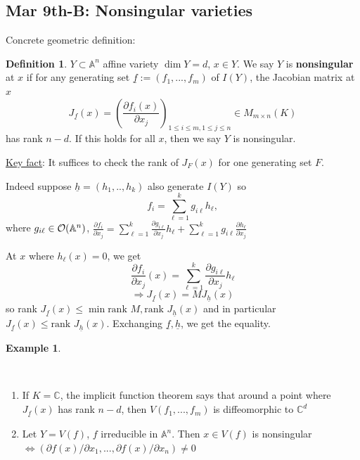 \documentclass[11pt]{article}
\theoremstyle{definition}
\newtheorem{dfn}[thm]{Definition}
\newtheorem{ex}[thm]{Example}
\newcommand{\affn}{\mathbb A}
\newcommand{\cplx}{\mathbb C}
\newcommand{\calo}{{\cal O}}
\newcommand{\pd}{\partial}
\newcommand{\Lrta}{\Longrightarrow}
\newcommand{\Llrta}{\Longleftrightarrow}
\begin{document}
\subsection{Mar 9th-B: Nonsingular varieties}
Concrete geometric definition:
\begin{dfn}
$Y\subset \affn^n$ affine variety $\dim Y=d$, $x\in Y$. We say $Y$ is \textbf{nonsingular} at $x$ if for any generating set $\underline{f}:=(f_1,...,f_m)$ of $I(Y)$, the Jacobian matrix at $x$
$$
J_{\underline{f}}(x)=\left(\frac{\pd f_i(x)}{\pd x_j}\right)_{1\leq i\leq m, 1\leq j \leq n}\in M_{m\times n}(K)
$$
has rank $n-d$. If this holds for all $x$, then we say $Y$ is nonsingular.
\end{dfn}
\underline{Key fact}: It suffices to check the rank of $J_F(x)$ for one generating set $F$. 

Indeed suppose $\underline{h}=(h_1,..,h_k)$ also generate $I(Y)$ so
$$
f_i = \sum^k_{\ell=1} g_{i\ell} h_\ell,
$$
where $g_{i\ell}\in \calo(\affn^n)$, $\frac{\pd f_i}{\pd x_j}=\sum^k_{\ell=1}\frac{\pd g_{i\ell}}{\pd x_j}h_\ell+\sum^k_{\ell=1}g_{i\ell}\frac{\pd h_\ell}{\pd x_j}$

At $x$ where $h_\ell(x)=0$, we get 
$$
\frac{\pd f_i}{\pd x_j}(x)=\sum^k_{\ell=1}\frac{\pd g_{i\ell}}{\pd x_j}h_\ell
$$
$$
\Lrta J_{\underline{f}}(x)=M J_{\underline{h}}(x)
$$
so rank $J_{\underline{f}}(x)\leq \min{\text{rank } M, \text{rank } J_{\underline{h}}(x)}$ and in particular $J_{\underline{f}}(x)\leq  \text{rank } J_{\underline{h}}(x)$. Exchanging $\underline{f},\underline{h}$, we get the equality.
\begin{ex}

\end{ex}\ 
\begin{enumerate}[label=(\arabic*)]
\item If $K=\cplx$, the implicit function theorem says that around a point where $J_{\underline{f}}(x)$ has rank $n-d$, then $V(f_1,...,f_m)$ is diffeomorphic to $\cplx^d$
\item Let $Y=V(f)$, $f$ irreducible in $\affn^n$. Then $x\in V(f)$ is nonsingular
$\Llrta(\pd f(x)/\pd x_1,...,\pd f(x)/\pd x_n)\neq 0$
\end{enumerate}
\end{document}
